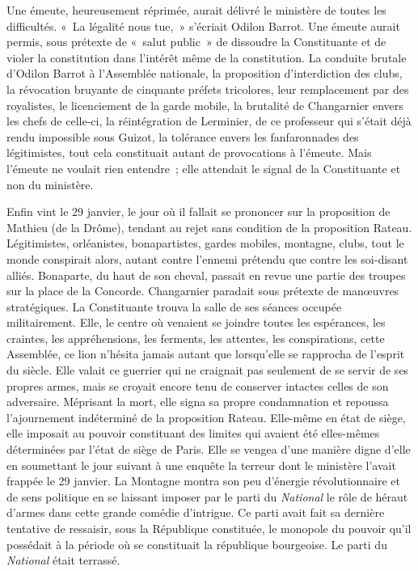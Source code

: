 \documentclass[french,twoside]{book} %
\begin{document}
Une émeute, heureusement réprimée, aurait délivré le ministère de toutes les difficultés. « La légalité nous tue, » s’écriait Odilon Barrot. Une émeute aurait permis, sous prétexte de « salut public » de dissoudre la Constituante et de violer la constitution dans l’intérêt même de la constitution. La conduite brutale d’Odilon Barrot à l’Assemblée nationale, la proposition d’interdiction des clubs, la révocation bruyante de cinquante préfets tricolores, leur remplacement par des royalistes, le licenciement de la garde mobile, la brutalité de Changarnier envers les chefs de celle-ci, la réintégration de Lerminier, de ce professeur qui s’était déjà rendu impossible sous Guizot, la tolérance envers les fanfaronnades des légitimistes, tout cela constituait autant de provocations à l’émeute. Mais l’émeute ne voulait rien entendre ; elle attendait le signal de la Constituante et non du ministère.\par
Enfin vint le 29 janvier, le jour où il fallait se prononcer sur la proposition de Mathieu (de la Drôme), tendant au rejet sans condition de la proposition Rateau. Légitimistes, orléanistes, bonapartistes, gardes mobiles, montagne, clubs, tout le monde conspirait alors, autant contre l’ennemi prétendu que contre les soi-disant alliés. Bonaparte, du haut de son cheval, passait en revue une partie des troupes sur la place de la Concorde. Changarnier paradait sous prétexte de manœuvres stratégiques. La Constituante trouva la salle de ses séances occupée militairement. Elle, le centre où venaient se joindre toutes les espérances, les craintes, les appréhensions, les ferments, les attentes, les conspirations, cette Assemblée, ce lion n’hésita jamais autant que lorsqu’elle se rapprocha de l’esprit du siècle. Elle valait ce guerrier qui ne craignait pas seulement de se servir de ses propres armes, mais se croyait encore tenu de conserver intactes celles de son adversaire. Méprisant la mort, elle signa sa propre condamnation et repoussa l’ajournement indéterminé de la proposition Rateau. Elle-même en état de siège, elle imposait au pouvoir constituant des limites qui avaient été elles-mêmes déterminées par l’état de siège de Paris. Elle se vengea d’une manière digne d’elle en soumettant le jour suivant à une enquête la terreur dont le ministère l’avait frappée le 29 janvier. La Montagne montra son peu d’énergie révolutionnaire et de sens politique en se laissant imposer par le parti du \emph{National} le rôle de héraut d’armes dans cette grande comédie d’intrigue. Ce parti avait fait sa dernière tentative de ressaisir, sous la République constituée, le monopole du pouvoir qu’il possédait à la période où se constituait la république bourgeoise. Le parti du \emph{National} était terrassé.\par
\end{document}
